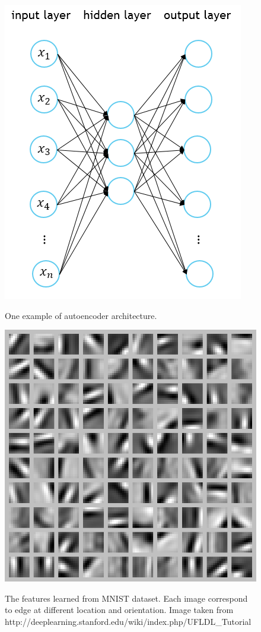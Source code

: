 \documentclass[a4paper,11pt]{kth-mag}
\begin{document}
\begin{figure}[h]
\centering
\includegraphics[scale=0.4]{image/autoencoder_architecture.png}
\label{fig:autoencoder_architecture.png}
\caption{One example of autoencoder architecture.}
\end{figure}

\begin{figure}[h]
\centering
\includegraphics[scale=0.3]{image/autoencoder.png}
\label{fig:autoencoder}
\caption{The features learned from MNIST dataset. Each image correspond to edge at different location and orientation. Image taken from http://deeplearning.stanford.edu/wiki/index.php/UFLDL\_Tutorial}
\end{figure}
\end{document}
